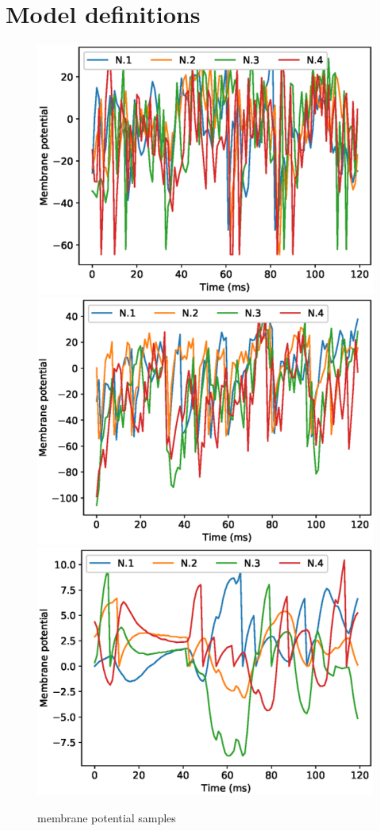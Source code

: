 \documentclass[mphil,deptreport,ianc]{infthesis} %
\begin{document}



\section{Model definitions}

\begin{figure}
    \centering
    \vskip -0.1in
    \includegraphics[width=0.49\columnwidth]{figures/samples/membrane_potentials/export_sample_LIF_white_noise.eps}
    \includegraphics[width=0.49\columnwidth]{figures/samples/membrane_potentials/export_sample_GLIF_white_noise.eps}
    \includegraphics[width=0.49\columnwidth]{figures/samples/membrane_potentials/export_sample_mesoGIF_white_noise.eps}
    \vskip -0.1in
    \caption{membrane potential samples}
    \label{fig:membrane_potential_samples}
    \vskip -0.2in
\end{figure}
\end{document}
